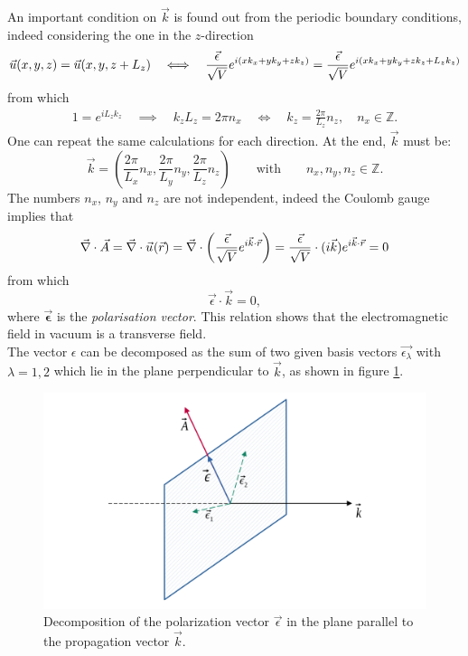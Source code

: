 An important condition on $\vec{k}$ is found out from the periodic boundary conditions, indeed considering the one in the $z$-direction
\begin{gather*}
    \vec{u}(x, y, z) = \vec{u}(x, y, z+L_z) \quad \Longleftrightarrow \quad 
    \frac{\vec{\epsilon}}{\sqrt{V}} e^{i(x k_x + y k_y + z k_z)} = \frac{\vec{\epsilon}}{\sqrt{V}} e^{i(x k_x + y k_y + z k_z + L_z k_z)}
\end{gather*}
from which 
\begin{align}
    1 = e^{i L_z k_z} \quad \implies \quad k_z L_z = 2 \pi n_x \quad \Longleftrightarrow \quad k_z = \frac{2\pi}{L_z} n_z, \quad n_x \in \mathbb{Z}. 
    \label{eq:boundary}
\end{align}
One can repeat the same calculations for each direction. At the end, $\vec{k}$ must be:
\begin{equation}
    \vec{k} = \left( \frac{2 \pi}{L_x} n_x, \frac{2 \pi}{L_y} n_y, \frac{2 \pi}{L_z} n_z\right) \qquad \text{with} \qquad n_x, n_y, n_z \in \mathbb{Z}. 
\end{equation}
The numbers $n_x$, $n_y$ and $n_z$ are not independent, indeed the Coulomb gauge implies that
\begin{align*}
     \vec{\nabla} \cdot \vec{A} = \vec{\nabla} \cdot \vec{u}_{}(\vec{r}) = \vec{\nabla} \cdot \left(  \frac{\vec{\epsilon}}{\sqrt{V}} e^{i \vec{k} \cdot \vec{r}} \right) =
    \frac{\vec{\epsilon}}{\sqrt{V}} \cdot (i \vec{k}) e^{i \vec{k} \cdot \vec{r}} = 0 
\end{align*}
from which 
\begin{equation}
    \vec{\epsilon} \cdot \vec{k} = 0,
\end{equation}
where $\vec{\mathbf{\epsilon}}$ is the \textit{polarisation vector}. This relation shows that the electromagnetic field in vacuum is a transverse field. \\
The vector $\epsilon$ can be decomposed as the sum of two given basis vectors $\vec{\epsilon_{\lambda}}$ with $\lambda = 1, 2$ which lie in the plane perpendicular to $\vec{k}$, as shown in figure \ref{fig:Pol}. 
\begin{figure}[h!]
\centering
    \includegraphics[width=0.78\linewidth]{images/Polarisation.png}
    \caption{Decomposition of the polarization vector $\vec{\epsilon}$ in the plane parallel to the propagation vector $\vec{k}$.}
    \label{fig:Pol}
\end{figure}

